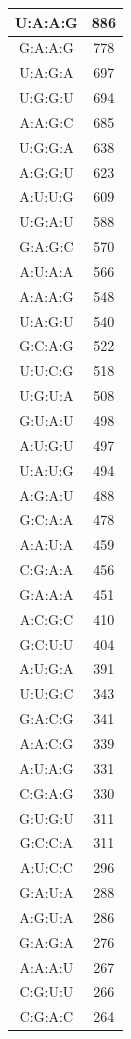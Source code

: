 \begin{center}
\begin{longtable}{c|c}
U:A:A:G & 886 \\ \hline
G:A:A:G & 778 \\ \hline
U:A:G:A & 697 \\ \hline
U:G:G:U & 694 \\ \hline
A:A:G:C & 685 \\ \hline
U:G:G:A & 638 \\ \hline
A:G:G:U & 623 \\ \hline
A:U:U:G & 609 \\ \hline
U:G:A:U & 588 \\ \hline
G:A:G:C & 570 \\ \hline
A:U:A:A & 566 \\ \hline
A:A:A:G & 548 \\ \hline
U:A:G:U & 540 \\ \hline
G:C:A:G & 522 \\ \hline
U:U:C:G & 518 \\ \hline
U:G:U:A & 508 \\ \hline
G:U:A:U & 498 \\ \hline
A:U:G:U & 497 \\ \hline
U:A:U:G & 494 \\ \hline
A:G:A:U & 488 \\ \hline
G:C:A:A & 478 \\ \hline
A:A:U:A & 459 \\ \hline
C:G:A:A & 456 \\ \hline
G:A:A:A & 451 \\ \hline
A:C:G:C & 410 \\ \hline
G:C:U:U & 404 \\ \hline
A:U:G:A & 391 \\ \hline
U:U:G:C & 343 \\ \hline
G:A:C:G & 341 \\ \hline
A:A:C:G & 339 \\ \hline
A:U:A:G & 331 \\ \hline
C:G:A:G & 330 \\ \hline
G:U:G:U & 311 \\ \hline
G:C:C:A & 311 \\ \hline
A:U:C:C & 296 \\ \hline
G:A:U:A & 288 \\ \hline
A:G:U:A & 286 \\ \hline
G:A:G:A & 276 \\ \hline
A:A:A:U & 267 \\ \hline
C:G:U:U & 266 \\ \hline
C:G:A:C & 264 \\ \hline

\end{longtable}
\end{center}
